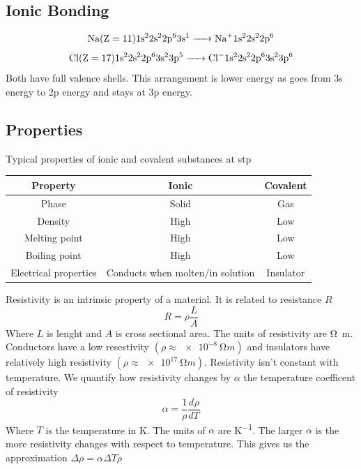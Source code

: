 \documentclass{article}
\newcommand{\dv}[3][]{\frac{d^{#1}{#2}}{d{#3}^{#1}}}
\begin{document}
\subsection*{Ionic Bonding}

\[\text{\ce{Na}}(\mathrm{Z}=11)\mathrm{1s^22s^22p^63s^1}\ce{->Na+}\mathrm{1s^22s^22p^6}\]
\[\text{\ce{Cl}}(\mathrm{Z}=17)\mathrm{1s^22s^22p^63s^23p^5}\ce{->Cl-}\mathrm{1s^22s^22p^63s^23p^6}\]
Both have full valence shells. This arrangement is lower energy as  goes from 3s energy to 2p energy and  stays at 3p energy.

\subsection*{Properties}
Typical properties of ionic and covalent substances at stp
\begin{center}
\begin{tabular}{|c|cc|}\hline
 Property & Ionic & Covalent\\ \hline
 Phase & Solid & Gas\\
 Density & High & Low\\
 Melting point & High & Low\\
 Boiling point & High & Low\\
 Electrical properties & Conducts when molten/in solution & Insulator\\\hline
\end{tabular}
\end{center}

Resistivity is an intrinsic property of a material. It is related to resistance \(R\)
\[R=\rho\frac{L}{A}\]
Where \(L\) is lenght and \(A\) is cross sectional area. The units of resistivity are \si{\ohm m}. Conductors have a low resestivity \((\rho\approx\SI{e-8}{\ohm m})\) and insulators have relatively high resistivity \((\rho\approx\SI{e17}{\ohm m})\). Resistivity isn't constant with temperature. We quantify how resistivity changes  by \(\alpha\) the temperature coefficent of resistivity
\[\alpha=\frac{1}{\rho}\dv{\rho}{T}\]
Where \(T\) is the temperature in \si{K}. The units of \(\alpha\) are \si{K^{-1}}. The larger \(\alpha\) is the more resistivity changes with respect to temperature. This gives us the approximation \(\Delta\rho=\alpha\Delta T\rho\)
\end{document}
